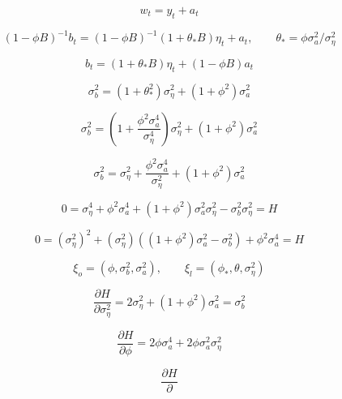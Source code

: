 $$w_t = y_t + a_t$$

$$(1-\phi B)^{-1}b_t = (1 - \phi B)^{-1}(1 + \theta_* B)\eta_t + a_t, \qquad \theta_* = \phi\sigma_a^2 / \sigma_\eta^2$$

$$ b_t = (1 + \theta_*B)\eta_t + (1 - \phi B)a_t $$

$$ \sigma_b^2 = (1 + \theta_*^2)\sigma_\eta^2 + (1 + \phi^2)\sigma_a^2 $$

$$ \sigma_b^2 = (1 + \frac{\phi^2\sigma_a^4}{\sigma_\eta^4})\sigma_\eta^2 + (1 + \phi^2)\sigma_a^2 $$

$$ \sigma_b^2 = \sigma_\eta^2 + \frac{\phi^2\sigma_a^4}{\sigma_\eta^2} + (1 + \phi^2)\sigma_a^2 $$

$$ 0 = \sigma_\eta^4 + \phi^2\sigma_a^4 + (1 + \phi^2)\sigma_a^2\sigma_\eta^2 - \sigma_b^2\sigma_\eta^2 = H $$

$$ 0 = (\sigma_\eta^2)^2 + 
(\sigma_\eta^2)((1 + \phi^2)\sigma_a^2 - \sigma_b^2) +
\phi^2\sigma_a^4 = H $$

$$ \xi_o = (\phi, \sigma_b^2, \sigma_a^2),\qquad \xi_l= (\phi_*,\theta,\sigma_\eta^2)$$


$$\frac{\partial H}{\partial \sigma_\eta^2} = 2\sigma_\eta^2 + (1 + \phi^2)\sigma_a^2 = \sigma_b^2$$

$$\frac{\partial H}{\partial\phi} = 2\phi \sigma_a^4 + 2\phi\sigma_a^2\sigma_\eta^2 $$

$$\frac{\partial H}{\partial }$$








